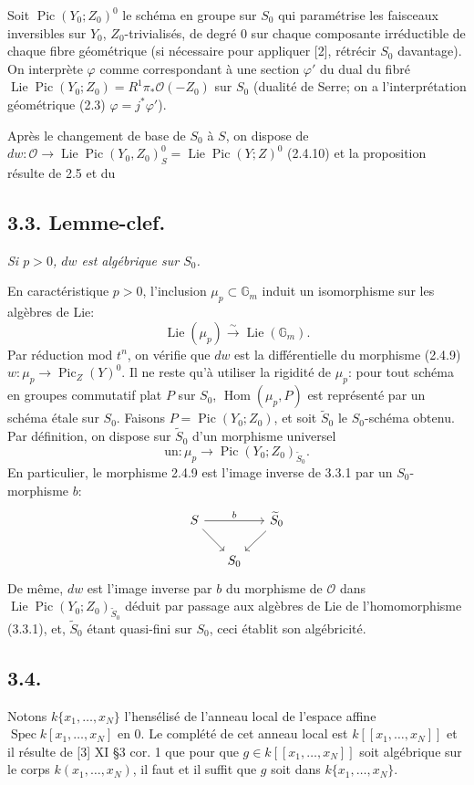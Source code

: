 \documentclass[11pt,leqno]{article}
\DeclareMathOperator{\Spec}{Spec}
\DeclareMathOperator{\Lie}{Lie}
\DeclareMathOperator{\Pic}{Pic}
\DeclareMathOperator{\Hom}{Hom}
\newcommand{\OO}{\mathcal O}
\newcommand{\GG}{\mathbb G}
\begin{document}
Soit $\Pic(Y_0;Z_0)^0$ le schéma en groupe sur $S_0$ qui paramétrise les faisceaux inversibles sur $Y_0$, $Z_0$-trivialisés, de degré 0 sur chaque composante irréductible de chaque fibre géométrique (si nécessaire pour appliquer [2], rétrécir $S_0$ davantage). On interprète $\varphi$ comme correspondant à une section $\varphi'$ du dual du fibré $\Lie\Pic(Y_0;Z_0)=R^1\pi_*\OO(-Z_0)$ sur $S_0$ (dualité de Serre; on a l'interprétation géométrique (2.3) $\varphi=j^*\varphi'$).

Après le changement de base de $S_0$ à $S$, on dispose de $dw:\OO\to\Lie\Pic(Y_0,Z_0)^0_S=\Lie\Pic(Y;Z)^0$ (2.4.10) et la proposition résulte de 2.5 et du

\subsection*{3.3. Lemme-clef.}
\emph{Si $p>0$, $dw$ est algébrique sur $S_0$.}

En caractéristique $p>0$, l'inclusion $\mu_p\subset\GG_m$ induit un isomorphisme sur les algèbres de Lie:
\[
        \Lie(\mu_p)\xrightarrow{\sim}\Lie(\GG_m).
\]
Par réduction mod $t^n$, on vérifie que $dw$ est la différentielle du morphisme (2.4.9) $w:\mu_p\to\Pic_Z(Y)^0$. Il ne reste qu'à utiliser la rigidité de $\mu_p$: pour tout schéma en groupes commutatif plat $P$ sur $S_0$, $\Hom(\mu_p,P)$ est représenté par un schéma étale sur $S_0$. Faisons $P=\Pic(Y_0;Z_0)$, et soit $\widetilde S_0$ le $S_0$-schéma obtenu. Par définition, on dispose sur $\widetilde S_0$ d'un morphisme universel
\begin{equation}
        \mathrm{un}:\mu_p\longrightarrow\Pic(Y_0;Z_0)_{\widetilde S_0}. \tag{3.3.1}
\end{equation}
En particulier, le morphisme 2.4.9 est l'image inverse de 3.3.1 par un $S_0$-morphisme $b$:
\[
\begin{tikzcd}[column sep=1.4em,row sep=1.6em]
S \arrow[rr,"b"] \arrow[dr] & & \widetilde S_0 \arrow[dl] \\
& S_0 &
\end{tikzcd}
\]
De même, $dw$ est l'image inverse par $b$ du morphisme de $\OO$ dans $\Lie\Pic(Y_0;Z_0)_{\widetilde S_0}$ déduit par passage aux algèbres de Lie de l'homomorphisme (3.3.1), et, $\widetilde S_0$ étant quasi-fini sur $S_0$, ceci établit son algébricité.
\clearpage
\subsection*{3.4.}
Notons $k\{x_1,\ldots,x_N\}$ l'hensélisé de l'anneau local de l'espace affine $\Spec k[x_1,\ldots,x_N]$ en 0. Le complété de cet anneau local est $k[[x_1,\ldots,x_N]]$ et il résulte de [3] XI §3 cor. 1 que pour que $g\in k[[x_1,\ldots,x_N]]$ soit algébrique sur le corps $k(x_1,\ldots,x_N)$, il faut et il suffit que $g$ soit dans $k\{x_1,\ldots,x_N\}$.
\end{document}
